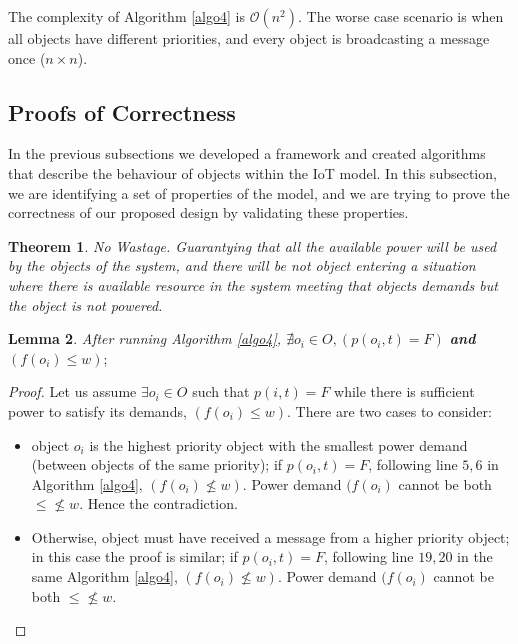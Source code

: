\documentclass[letterpaper, 10 pt, conference]{ieeeconf}
\begin{document}
The complexity of Algorithm \ref{algo4} is $\mathcal{O}(n^2)$. The worse case scenario is when all objects have different priorities, and every object is broadcasting a message once ($n\times n$).

\subsection{Proofs of Correctness}
In the previous subsections we developed a framework and created algorithms that describe the behaviour of objects within the IoT model. In this subsection, we are identifying a set of properties of the model, and we are trying to prove the correctness of our proposed design by validating these properties.
\newtheorem{theorem}{Theorem}[section]
\newtheorem{lemma}[theorem]{Lemma}
\begin{theorem}
\emph{No Wastage}. Guarantying that all the available power will be used by the objects of the system, and there will be not object entering a situation where there is available resource in the system meeting that objects demands but the object is not powered.
\end{theorem}

\begin{lemma}\label{lemma1}
  After running Algorithm \ref{algo4}, $\nexists o_{i}\in O, (p(o_{i},t) = F)$ \textbf{and} $(f(o_{i})\leq w); $
\end{lemma}

\begin{proof} Let us assume $\exists o_{i} \in O$ such that $p(i,t)=F$ while there is sufficient power to satisfy its demands, $(f(o_{i})\leq w)$. There are two cases to consider:

\begin{itemize}
  \item object $o_{i}$ is the highest priority object with the smallest power demand (between objects of the same priority); if $p(o_{i},t)=F$, following line $5,6$ in Algorithm \ref{algo4}, $(f(o_{i})\nleq w)$. Power demand $(f(o_{i})$ cannot be both $\leq\nleq w$. Hence the contradiction.
  \item Otherwise, object must have received a message from a higher priority object; in this case the proof is similar; if $p(o_{i},t)=F$, following line $19, 20$ in the same Algorithm \ref{algo4}, $(f(o_{i})\nleq w)$. Power demand $(f(o_{i})$ cannot be both $\leq\nleq w$.
\end{itemize}
\end{proof}
\end{document}
